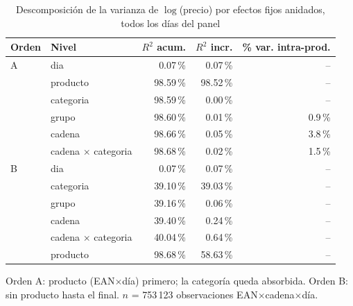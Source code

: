 \begin{table}[htbp]
\caption{Descomposici\'on de la varianza de $\log$(precio) por efectos fijos anidados, todos los d\'ias del panel}
\label{tab:varianza}
\centering\scriptsize\setlength{\tabcolsep}{3pt}
\begin{tabular}{@{}llrrr@{}}
\toprule
Orden & Nivel & $R^2$ acum. & $R^2$ incr. & \% var. intra-prod. \\
\midrule
A & dia & 0.07\,\% & 0.07\,\% & -- \\
 & producto & 98.59\,\% & 98.52\,\% & -- \\
 & categoria & 98.59\,\% & 0.00\,\% & -- \\
 & grupo & 98.60\,\% & 0.01\,\% & 0.9\,\% \\
 & cadena & 98.66\,\% & 0.05\,\% & 3.8\,\% \\
 & cadena $\times$ categoria & 98.68\,\% & 0.02\,\% & 1.5\,\% \\
\midrule
B & dia & 0.07\,\% & 0.07\,\% & -- \\
 & categoria & 39.10\,\% & 39.03\,\% & -- \\
 & grupo & 39.16\,\% & 0.06\,\% & -- \\
 & cadena & 39.40\,\% & 0.24\,\% & -- \\
 & cadena $\times$ categoria & 40.04\,\% & 0.64\,\% & -- \\
 & producto & 98.68\,\% & 58.63\,\% & -- \\
\bottomrule\end{tabular}
\par\smallskip\raggedright\scriptsize Orden A: producto (EAN$\times$d\'ia) primero; la categor\'ia queda absorbida. Orden B: sin producto hasta el final. $n$ = 753\,123 observaciones EAN$\times$cadena$\times$d\'ia.
\end{table}
